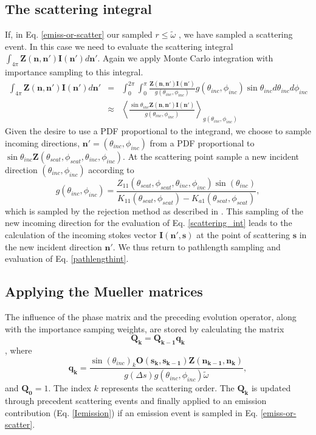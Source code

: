 \subsection {The scattering integral}

If, in Eq. \ref{emiss-or-scatter} our sampled $r\le\tilde{\omega}$
, we have sampled a scattering event.  In this case we need to evaluate the scattering
integral $\int_{4\pi}\mathbf{Z(n,n')}\mathbf{I(n')}d\mathbf{n'}$.
Again we apply Monte Carlo integration with importance sampling to
this integral.
\begin{eqnarray}
\int_{4\pi}\mathbf{Z(n,n')}\mathbf{I(n')}d\mathbf{n'}&=&
\int_0^{2\pi}\int_0^\pi\frac{\mathbf{Z(n,n')}\mathbf{I(n')}}
{g(\theta_{inc},\phi_{inc})}g(\theta_{inc},\phi_{inc})
\sin{\theta_{inc}}d\theta_{inc}d\phi_{inc}\\
&\approx&\left\langle\frac{\sin{\theta_{inc}}\mathbf{Z(n,n')}\mathbf{I(n')}}
{g(\theta_{inc},\phi_{inc})}\right\rangle_{g(\theta_{inc},\phi_{inc})}
\label{scattering_int}
\end{eqnarray}
Given the desire to use a PDF proportional to the integrand, we
choose to sample incoming directions,
$\mathbf{n'}=(\theta_{inc},\phi_{inc})$ from a PDF proportional
to $\sin{\theta_{inc}}\mathbf{Z}(\theta_{scat},\phi_{scat},\theta_{inc},\phi_{inc})$.
At the scattering point sample a new incident direction
  $(\theta_{inc},\phi_{inc})$ according to 
\begin{equation}
g(\theta_{inc},\phi_{inc})=\frac{Z_{11}(\theta_{scat},\phi_{scat},
\theta_{inc},\phi_{inc})\sin(\theta_{inc})}{K_{11}(\theta_{scat},\phi_{scat})
  - K_{a1}(\theta_{scat},\phi_{scat})},
\label{gdir}
\end{equation}
which is
sampled by the rejection method as described in \cite{liu:01}.  This sampling of
the new incoming direction for the evaluation of Eq. \ref{scattering_int} leads
to the calculation of the incoming stokes vector $\mathbf{I(n',s)}$ at the point
of scattering $\mathbf{s}$ in the new incident direction $\mathbf{n'}$. We thus
return to pathlength sampling and evaluation of Eq. \ref{pathlengthint}.

\subsection{Applying the Mueller matrices}

The influence of the phase matrix and the preceding evolution operator, along
with the importance samping weights, are stored by calculating the matrix
\begin{equation}
\mathbf{Q_k}=\mathbf{Q_{k-1}q_k}
\label{Q}
\end{equation}
, where
\begin{equation}
\mathbf{q_k}=\frac{\sin(\theta_{inc})_k
  \mathbf{O(s_k,s_{k-1})}\mathbf{Z(n_{k-1},n_k)}}
  {g\left(\Delta s\right)g(\theta_{inc},\phi_{inc}) \tilde{\omega}} ,
\label{q}
\end{equation}
and $\mathbf{Q_0}={1}$. The index $k$ represents the
scattering order.  The $\mathbf{Q_k}$ is updated through precedent scattering
events and finally applied to an emission contribution (Eq. \ref{Iemission}) if
an emission event is sampled in Eq. \ref{emiss-or-scatter}.

